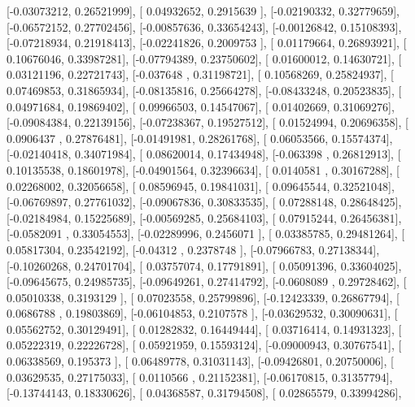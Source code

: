 \documentclass{article}
\begin{document}
       [-0.03073212,  0.26521999],
       [ 0.04932652,  0.2915639 ],
       [-0.02190332,  0.32779659],
       [-0.06572152,  0.27702456],
       [-0.00857636,  0.33654243],
       [-0.00126842,  0.15108393],
       [-0.07218934,  0.21918413],
       [-0.02241826,  0.2009753 ],
       [ 0.01179664,  0.26893921],
       [ 0.10676046,  0.33987281],
       [-0.07794389,  0.23750602],
       [ 0.01600012,  0.14630721],
       [ 0.03121196,  0.22721743],
       [-0.037648  ,  0.31198721],
       [ 0.10568269,  0.25824937],
       [ 0.07469853,  0.31865934],
       [-0.08135816,  0.25664278],
       [-0.08433248,  0.20523835],
       [ 0.04971684,  0.19869402],
       [ 0.09966503,  0.14547067],
       [ 0.01402669,  0.31069276],
       [-0.09084384,  0.22139156],
       [-0.07238367,  0.19527512],
       [ 0.01524994,  0.20696358],
       [ 0.0906437 ,  0.27876481],
       [-0.01491981,  0.28261768],
       [ 0.06053566,  0.15574374],
       [-0.02140418,  0.34071984],
       [ 0.08620014,  0.17434948],
       [-0.063398  ,  0.26812913],
       [ 0.10135538,  0.18601978],
       [-0.04901564,  0.32396634],
       [ 0.0140581 ,  0.30167288],
       [ 0.02268002,  0.32056658],
       [ 0.08596945,  0.19841031],
       [ 0.09645544,  0.32521048],
       [-0.06769897,  0.27761032],
       [-0.09067836,  0.30833535],
       [ 0.07288148,  0.28648425],
       [-0.02184984,  0.15225689],
       [-0.00569285,  0.25684103],
       [ 0.07915244,  0.26456381],
       [-0.0582091 ,  0.33054553],
       [-0.02289996,  0.2456071 ],
       [ 0.03385785,  0.29481264],
       [ 0.05817304,  0.23542192],
       [-0.04312   ,  0.2378748 ],
       [-0.07966783,  0.27138344],
       [-0.10260268,  0.24701704],
       [ 0.03757074,  0.17791891],
       [ 0.05091396,  0.33604025],
       [-0.09645675,  0.24985735],
       [-0.09649261,  0.27414792],
       [-0.0608089 ,  0.29728462],
       [ 0.05010338,  0.3193129 ],
       [ 0.07023558,  0.25799896],
       [-0.12423339,  0.26867794],
       [ 0.0686788 ,  0.19803869],
       [-0.06104853,  0.2107578 ],
       [-0.03629532,  0.30090631],
       [ 0.05562752,  0.30129491],
       [ 0.01282832,  0.16449444],
       [ 0.03716414,  0.14931323],
       [ 0.05222319,  0.22226728],
       [ 0.05921959,  0.15593124],
       [-0.09000943,  0.30767541],
       [ 0.06338569,  0.195373  ],
       [ 0.06489778,  0.31031143],
       [-0.09426801,  0.20750006],
       [ 0.03629535,  0.27175033],
       [ 0.0110566 ,  0.21152381],
       [-0.06170815,  0.31357794],
       [-0.13744143,  0.18330626],
       [ 0.04368587,  0.31794508],
       [ 0.02865579,  0.33994286],
\end{document}
